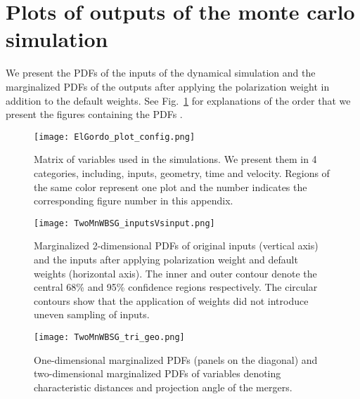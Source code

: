 \documentclass[ucdthesis.tex]{subfiles}
\begin{document}
    \section{Plots of outputs of the monte carlo simulation}
    We present the PDFs of the inputs of the dynamical simulation and the
    marginalized PDFs of the outputs after applying the polarization weight in
    addition to the default weights. See Fig.~\ref{fig:plot_config} for explanations of
    the order that we present the figures containing the PDFs . 
    \begin{figure}
    	\begin{center}
    	\texttt{[image: ElGordo\_plot\_config.png]}
    	\end{center}
    	\caption{Matrix of variables used in the simulations. We present them in
    	4 categories, including, inputs, geometry, time and velocity. Regions of
    	the same color represent one plot and the number
    indicates the corresponding figure number in this appendix.
    \label{fig:plot_config}
    }
    \end{figure}
    \label{app:results}
    \clearpage
    \begin{figure*}
    	\begin{minipage}{180mm}
    	\begin{center}
    	\texttt{[image: TwoMnWBSG\_inputsVsinput.png]}
    	\caption{Marginalized 2-dimensional PDFs of original inputs (vertical axis) 
    		and the inputs after applying polarization weight and default weights 
    		(horizontal axis). The inner and outer contour
    denote the central 68\% and 95\% confidence regions respectively.
    The circular contours show that the application of weights did not introduce
    uneven sampling of inputs. }
    	\end{center}
    	\end{minipage}
    \end{figure*}
    \begin{figure*}
    \begin{minipage}{180mm}
    	\begin{center}
    	\texttt{[image: TwoMnWBSG\_tri\_geo.png]}
    	\caption{One-dimensional marginalized PDFs (panels on the diagonal) and
    		two-dimensional marginalized PDFs of variables
    		denoting characteristic distances and projection angle of the mergers.
    	\label{fig:geom_geom}
    	}
    	\end{center}
    	\end{minipage}
    \end{figure*}
\end{document}

